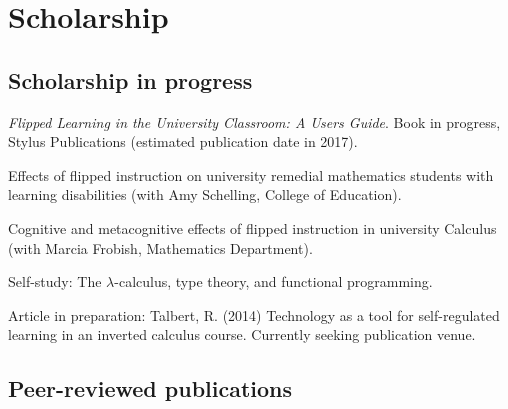 \documentclass[letterpaper]{article}
\renewenvironment{itemize}{
  \begin{list}{}{
    \setlength{\leftmargin}{1.5em}
	\setlength{\itemsep}{0in}
  }
}{
  \end{list}
}
\begin{document}
\section*{Scholarship}

\subsection*{Scholarship in progress}
\begin{itemize}
	\item \emph{Flipped Learning in the University Classroom: A Users Guide}. Book in progress, Stylus Publications (estimated publication date in 2017).  
	\item Effects of flipped instruction on university remedial mathematics students with learning disabilities (with Amy Schelling, College of Education). 
	\item Cognitive and metacognitive effects of flipped instruction in university Calculus (with Marcia Frobish, Mathematics Department). 
	\item Self-study: The $\lambda$-calculus, type theory, and functional programming. 
	\item Article in preparation: Talbert, R. (2014) Technology as a tool for self-regulated learning in an inverted calculus course. Currently seeking publication venue.  
\end{itemize}


\subsection*{Peer-reviewed publications}
\end{document}
